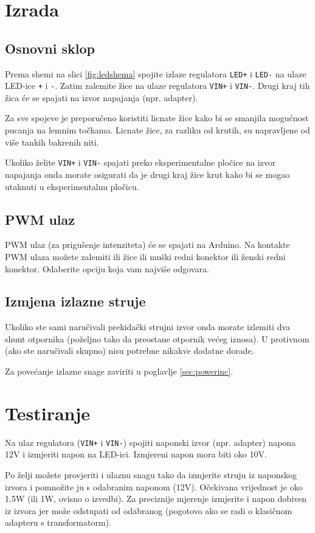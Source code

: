 \documentclass[times, utf8, zavrsni, numeric, sort]{fer}
\begin{document}
\section{Izrada}
\subsection{Osnovni sklop}
Prema shemi na slici \ref{fig:ledshema} spojite izlaze regulatora \texttt{LED+} i \texttt{LED-} na ulaze LED-ice \texttt{+} i \texttt{-}. Zatim zalemite žice na ulaze regulatora \texttt{VIN+} i \texttt{VIN-}. Drugi kraj tih žica će se spajati na izvor napajanja (npr. adapter).

Za sve spojeve je preporučeno koristiti licnate žice kako bi se smanjila mogućnost pucanja na lemnim točkama. Licnate žice, za razliku od krutih, su napravljene od više tankih bakrenih niti.

Ukoliko želite \texttt{VIN+} i \texttt{VIN-} spajati preko eksperimentalne pločice na izvor napajanja onda morate osigurati da je drugi kraj žice krut kako bi se mogao utaknuti u eksperimentalnu pločicu.

\subsection{PWM ulaz}
PWM ulaz (za prigušenje intenziteta) će se spajati na Arduino. Na kontakte PWM ulaza možete zalemiti ili žice ili muški redni konektor ili ženski redni konektor. Odaberite opciju koja vam najviše odgovara.

\subsection{Izmjena izlazne struje}
Ukoliko ste sami naručivali prekidački strujni izvor onda morate izlemiti dva shunt otpornika (poželjno tako da preostane otpornik većeg iznosa). U protivnom (ako ste naručivali skupno) nisu potrebne nikakve dodatne dorade.

Za povećanje izlazne snage zaviriti u poglavlje \ref{sec:powerinc}.

\section{Testiranje}
Na ulaz regulatora (\texttt{VIN+} i \texttt{VIN-}) spojiti naponski izvor (npr. adapter) napona 12V i izmjeriti napon na LED-ici. Izmjereni napon mora biti oko 10V.

Po želji možete provjeriti i ulaznu snagu tako da izmjerite struju iz naponskog izvora i pomnožite ju s odabranim naponom (12V). Očekivana vrijednost je oko 1.5W (ili 1W, ovisno o izvedbi). Za preciznije mjerenje izmjerite i napon dobiven iz izvora jer može odstupati od odabranog (pogotovo ako se radi o klasičnom adapteru s transformatorm).
\end{document}
